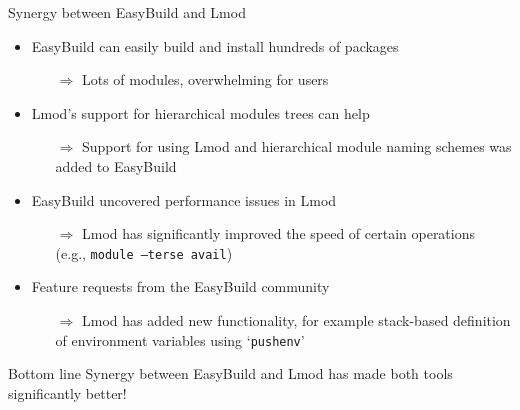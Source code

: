 \documentclass[10pt,xcolor={usenames,dvipsnames}]{beamer}
\begin{document}

\begin{frame}{Synergy between EasyBuild and Lmod}
\begin{itemize}
    \item
        EasyBuild can easily build and install hundreds of packages
        \begin{itemize}
            \item[$\Rightarrow$]
                Lots of modules, overwhelming for users
        \end{itemize}
    \item
        Lmod's support for hierarchical modules trees can help
        \begin{itemize}
            \item[$\Rightarrow$]
                Support for using Lmod and hierarchical module naming schemes
                was added to EasyBuild
        \end{itemize}
    \item
        EasyBuild uncovered performance issues in Lmod
        \begin{itemize}
            \item[$\Rightarrow$]
                Lmod has significantly improved the speed of certain operations \\
                (e.g., \texttt{module --terse avail})
        \end{itemize}
    \item
        Feature requests from the EasyBuild community
        \begin{itemize}
            \item[$\Rightarrow$]
                Lmod has added new functionality, for example stack-based definition of
                environment variables using `\texttt{pushenv}'
        \end{itemize}
\end{itemize}

\medskip\quad\quad
\begin{minipage}{0.9\textwidth}
    \begin{block}{Bottom line}
        Synergy between EasyBuild and Lmod has made both tools significantly better!
    \end{block}
\end{minipage}
\end{frame}

\end{document}
